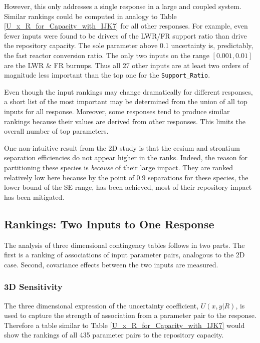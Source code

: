 However, this only addresses a single response in a large and coupled system.
Similar rankings could be computed in analogy to Table \ref{U_x_R_for_Capacity_with_IJK7} 
for all other responses.  For example, even fewer inputs were found to be drivers of the 
LWR/FR support ratio than drive the repository capacity.  The sole parameter above 
0.1 uncertainty is, predictably, the fast reactor conversion ratio.
The only two inputs on the range $[0.001, 0.01]$ are the LWR \& FR burnups.  
Thus all 27 other inputs are at least two orders of magnitude
less important than the top one for the \texttt{Support\_Ratio}.

Even though the input rankings may change dramatically for different responses, 
a short list of the most important may be determined from the union of all top
inputs for all response.  Moreover, some responses tend to produce similar rankings 
because their values are derived from other responses.
This limits the overall number of top parameters.

One non-intuitive result from the 2D study is that the cesium and strontium separation 
efficiencies do not appear higher in the ranks.  Indeed, the reason for
partitioning these species is \emph{because} of their large impact.  They are ranked 
relatively low here  because by the point of 0.9 separations for these species,
the lower bound of the SE range, has been achieved, most of their repository impact has been mitigated.

\subsection{Rankings: Two Inputs to One Response}
\label{cts_sec:rank3D}

The analysis of three dimensional contingency tables follows in two parts.  The first is 
a ranking of associations of input parameter pairs, analogous to
the 2D case.  Second, covariance effects between the two inputs are measured.

\subsubsection{3D Sensitivity}
\label{cts_sec:3D_sensitivity}

%
The three dimensional expression of the uncertainty coefficient, $U(x,y|R)$, is used to 
capture the strength of association from a parameter pair to the response.
Therefore a table similar to Table \ref{U_x_R_for_Capacity_with_IJK7} would show the 
rankings of all 435 parameter pairs
to the repository capacity.

